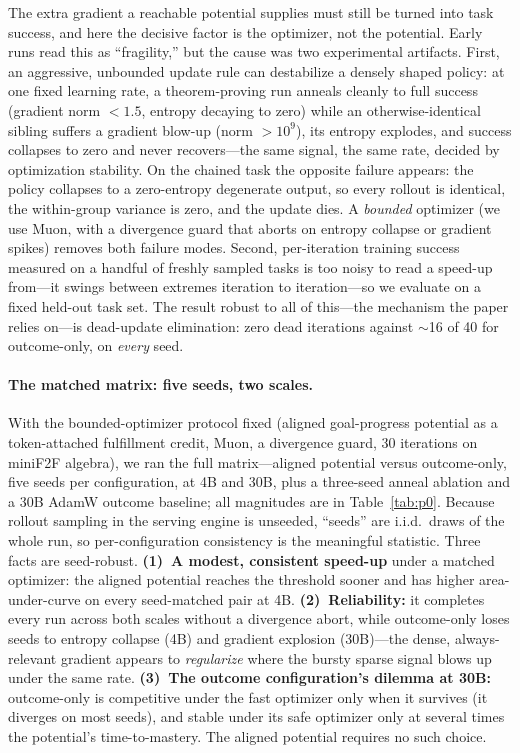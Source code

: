 The extra gradient a reachable potential supplies must still be turned into task success, and here the decisive factor is the optimizer, not the potential. Early runs read this as ``fragility,'' but the cause was two experimental artifacts. First, an aggressive, unbounded update rule can destabilize a densely shaped policy: at one fixed learning rate, a theorem-proving run anneals cleanly to full success (gradient norm $<1.5$, entropy decaying to zero) while an otherwise-identical sibling suffers a gradient blow-up (norm $>10^{9}$), its entropy explodes, and success collapses to zero and never recovers---the same signal, the same rate, decided by optimization stability. On the chained task the opposite failure appears: the policy collapses to a zero-entropy degenerate output, so every rollout is identical, the within-group variance is zero, and the update dies. A \emph{bounded} optimizer (we use Muon, with a divergence guard that aborts on entropy collapse or gradient spikes) removes both failure modes. Second, per-iteration training success measured on a handful of freshly sampled tasks is too noisy to read a speed-up from---it swings between extremes iteration to iteration---so we evaluate on a fixed held-out task set. The result robust to all of this---the mechanism the paper relies on---is dead-update elimination: zero dead iterations against $\sim$16 of 40 for outcome-only, on \emph{every} seed.

\paragraph{The matched matrix: five seeds, two scales.} With the bounded-optimizer protocol fixed (aligned goal-progress potential as a token-attached fulfillment credit, Muon, a divergence guard, $30$ iterations on miniF2F algebra), we ran the full matrix---aligned potential versus outcome-only, five seeds per configuration, at 4B and 30B, plus a three-seed anneal ablation and a 30B AdamW outcome baseline; all magnitudes are in Table~\ref{tab:p0}. Because rollout sampling in the serving engine is unseeded, ``seeds'' are i.i.d.\ draws of the whole run, so per-configuration consistency is the meaningful statistic. Three facts are seed-robust. \textbf{(1)~A modest, consistent speed-up} under a matched optimizer: the aligned potential reaches the threshold sooner and has higher area-under-curve on every seed-matched pair at 4B. \textbf{(2)~Reliability:} it completes every run across both scales without a divergence abort, while outcome-only loses seeds to entropy collapse (4B) and gradient explosion (30B)---the dense, always-relevant gradient appears to \emph{regularize} where the bursty sparse signal blows up under the same rate. \textbf{(3)~The outcome configuration's dilemma at 30B:} outcome-only is competitive under the fast optimizer only when it survives (it diverges on most seeds), and stable under its safe optimizer only at several times the potential's time-to-mastery. The aligned potential requires no such choice.

